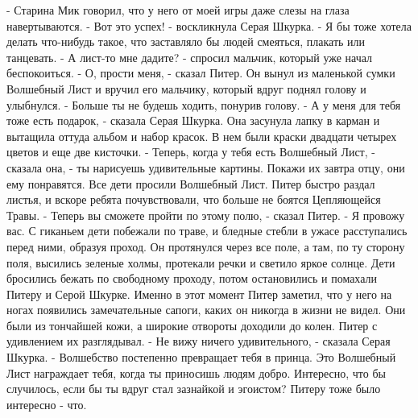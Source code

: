 - Старина Мик говорил, что у него от моей игры даже слезы на глаза 
навертываются.
    - Вот это успех! - воскликнула Серая Шкурка. - Я бы тоже хотела 
делать что-нибудь такое, что заставляло бы людей смеяться, плакать или 
танцевать.
    - А лист-то мне дадите? - спросил мальчик, который уже начал 
беспокоиться.
    - О, прости меня, - сказал Питер. Он вынул из маленькой сумки 
Волшебный Лист и вручил его мальчику, который вдруг поднял голову и 
улыбнулся. - Больше ты не будешь ходить, понурив голову.
    - А у меня для тебя тоже есть подарок, - сказала Серая Шкурка. Она 
засунула лапку в карман и вытащила оттуда альбом и набор красок. В нем 
были краски двадцати четырех цветов и еще две кисточки.
    - Теперь, когда у тебя есть Волшебный Лист, - сказала она, - ты 
нарисуешь удивительные картины. Покажи их завтра отцу, они ему 
понравятся.
    Все дети просили Волшебный Лист. Питер быстро раздал листья, и 
вскоре ребята почувствовали, что больше не боятся Цепляющейся Травы.
    - Теперь вы сможете пройти по этому полю, - сказал Питер. - Я 
провожу вас.
    С гиканьем дети побежали по траве, и бледные стебли в ужасе 
расступались перед ними, образуя проход. Он протянулся через все поле, 
а там, по ту сторону поля, высились зеленые холмы, протекали речки и 
светило яркое солнце. Дети бросились бежать по свободному проходу, 
потом остановились и помахали Питеру и Серой Шкурке.
    Именно в этот момент Питер заметил, что у него на ногах появились 
замечательные сапоги, каких он никогда в жизни не видел. Они были из 
тончайшей кожи, а широкие отвороты доходили до колен. Питер с 
удивлением их разглядывал.
    - Не вижу ничего удивительного, - сказала Серая Шкурка. - 
Волшебство постепенно превращает тебя в принца. Это Волшебный Лист 
награждает тебя, когда ты приносишь людям добро. Интересно, что бы 
случилось, если бы ты вдруг стал зазнайкой и эгоистом?
    Питеру тоже было интересно - что.